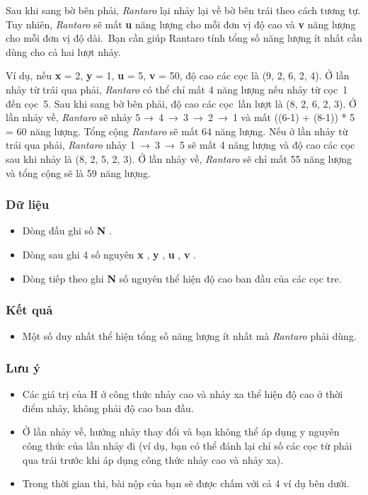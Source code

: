    Sau khi sang bờ bên phải,   \emph{    Rantaro   }   lại nhảy lại về bờ bên trái theo cách tương tự. Tuy nhiên,   \emph{    Rantaro   }   sẽ mất   \textbf{    u   }   năng lượng cho mỗi đơn vị độ cao và   \textbf{    v   }   năng lượng cho mỗi đơn vị độ dài. Bạn cần giúp Rantaro tính tổng số năng lượng ít nhất cần dùng cho cả hai lượt nhảy.  

   Ví dụ, nếu   \textbf{    x   }   = 2,   \textbf{    y   }   = 1,   \textbf{    u   }   = 5,   \textbf{    v   }   = 50, độ cao các cọc là (9, 2, 6, 2, 4). Ở lần nhảy từ trái qua phải,   \emph{    Rantaro   }   có thể chỉ mất 4 năng lượng nếu nhảy từ cọc 1 đến cọc 5. Sau khi sang bờ bên phải, độ cao các cọc lần lượt là (8, 2, 6, 2, 3). Ở lần nhảy về,   \emph{    Rantaro   }   sẽ nhảy 5 → 4 → 3 → 2 → 1 và mất ((6-1) + (8-1)) * 5 = 60 năng lượng. Tổng cộng   \emph{    Rantaro   }   sẽ mất 64 năng lượng. Nếu ở lần nhảy từ trái qua phải,   \emph{    Rantaro   }   nhảy 1 → 3 → 5 sẽ mất 4 năng lượng và độ cao các cọc sau khi nhảy là (8, 2, 5, 2, 3). Ở lần nhảy về,   \emph{    Rantaro   }   sẽ chỉ mất 55 năng lượng và tổng cộng sẽ là 59 năng lượng.  

\subsubsection{   Dữ liệu  }
\begin{itemize}
	\item     Dòng đầu ghi số    \textbf{     N    }    .   
	\item     Dòng sau ghi 4 số nguyên    \textbf{     x    }    ,    \textbf{     y    }    ,    \textbf{     u    }    ,    \textbf{     v    }    .   
	\item     Dòng tiếp theo ghi    \textbf{     N    }    số nguyên thể hiện độ cao ban đầu của các cọc tre.   
\end{itemize}

\subsubsection{   Kết quả  }
\begin{itemize}
	\item     Một số duy nhất thể hiện tổng số năng lượng ít nhất mà    \emph{     Rantaro    }    phải dùng.   
\end{itemize}

\subsubsection{   Lưu ý  }
\begin{itemize}
	\item     Các giá trị của H ở công thức nhảy cao và nhảy xa thể hiện độ cao ở thời điểm nhảy, không phải độ cao ban đầu.   
	\item     Ở lần nhảy về, hướng nhảy thay đổi và bạn không thể áp dụng y nguyên công thức của lần nhảy đi (ví dụ, bạn có thể đánh lại chỉ số các cọc từ phải qua trái trước khi áp dụng công thức nhảy cao và nhảy xa).   
	\item     Trong thời gian thi, bài nộp của bạn sẽ được chấm với cả 4 ví dụ bên dưới.   
\end{itemize}

